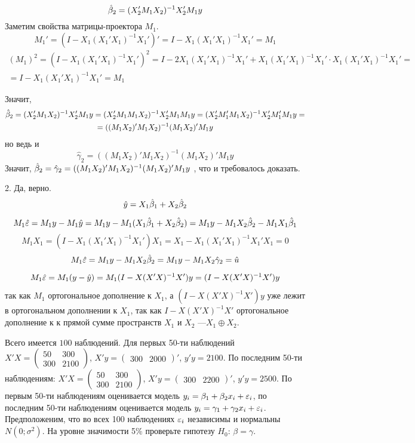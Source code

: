 \begin{solution}
\[\hat{\beta}_2=(X_2'M_1X_2)^{-1}X_2'M_1y\]
Заметим свойства матрицы-проектора $M_1$. 
\[M_1'=(I-X_1(X_1'X_1)^{-1}X_1')'=I-X_1(X_1'X_1)^{-1}X_1'=M_1\]
\begin{multline*}
(M_1)^2=(I-X_1(X_1'X_1)^{-1}X_1')^2=I-2X_1(X_1'X_1)^{-1}X_1'+X_1(X_1'X_1)^{-1}X_1'\cdot X_1(X_1'X_1)^{-1}X_1'=\\
=I-X_1(X_1'X_1)^{-1}X_1'=M_1
\end{multline*}

Значит,
\begin{multline*}
\hat{\beta}_2=(X_2'M_1X_2)^{-1}X_2'M_1y=(X_2'M_1M_1X_2)^{-1}X_2'M_1M_1y=(X_2'M_1'M_1X_2)^{-1}X_2'M_1'M_1y=\\=
((M_1X_2)'M_1X_2)^{-1}(M_1X_2)'M_1y
\end{multline*}
но ведь и
\[
\hat\gamma_2=
((M_1X_2)'M_1X_2)^{-1}(M_1X_2)'M_1y
\]
Значит, $\hat{\beta}_2=\hat\gamma_2=
((M_1X_2)'M_1X_2)^{-1}(M_1X_2)'M_1y$
, что и требовалось доказать.

2. Да, верно.
\[\hat{y}=X_1\hat{\beta}_1+X_2\hat{\beta}_2\]

\[M_1 \hat{\varepsilon}=M_1y-M_1\hat{y}=M_1y-M_1(X_1\hat\beta_1+X_2\hat{\beta}_2)=M_1y-M_1X_2\hat{\beta}_2-M_1X_1\hat\beta_1\]
\[M_1X_1=(I-X_1(X_1'X_1)^{-1}X_1')X_1=X_1-X_1(X_1'X_1)^{-1}X_1'X_1=0\]
\[M_1 \hat{\varepsilon}=M_1y-M_1X_2\hat{\beta}_2=M_1y-M_1X_2\hat\gamma_2=\hat u\]

\begin{multline*}
M_1\hat{\varepsilon}=M_1(y-\hat{y})=M_1(I-X(X'X)^{-1}X')y=(I-X(X'X)^{-1}X')y
\end{multline*}
так как $M_1$ ортогональное дополнение к $X_1$, а $(I-X(X'X)^{-1}X')y$ уже лежит в ортогональном дополнении к $X_1$, так как $I-X(X'X)^{-1}X'$ ортогональное дополнение к к прямой сумме пространств $X_1$ и $X_2$ ---$X_1\oplus X_2$.\end{solution}



\begin{problem}
Всего имеется $100$ наблюдений. Для первых 50-ти наблюдений $X'X=\begin{pmatrix}
50 & 300 \\
300 & 2100
\end{pmatrix}$, $X'y=\begin{pmatrix}
300 & 2000
\end{pmatrix}'$, $y'y=2100$. По последним 50-ти наблюдениям: $X'X=\begin{pmatrix}
50 & 300 \\
300 & 2100
\end{pmatrix}$, $X'y=\begin{pmatrix}
300 & 2200
\end{pmatrix}'$, $y'y=2500$. По первым 50-ти наблюдениям оценивается модель $y_i = \beta_1 + \beta_2 x_i + \varepsilon_i$, по последним 50-ти наблюдениям оценивается модель $y_i = \gamma_1 + \gamma_2 x_i + \varepsilon_i$. Предположеним, что во всех 100 наблюдениях $\varepsilon_i$ независимы и нормальны $N(0;\sigma^2)$. На уровне значимости 5\% проверьте гипотезу $H_0: \, \beta=\gamma$.
\end{problem}
\begin{solution}
\end{solution}


